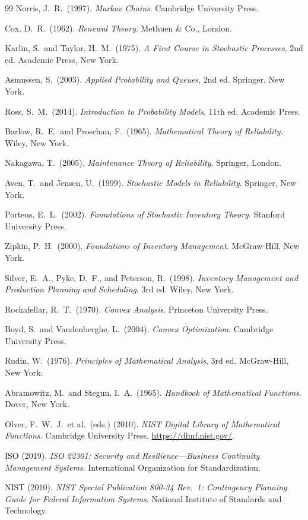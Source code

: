 \documentclass[12pt,a4paper]{article}
\theoremstyle{plain}
\theoremstyle{definition}
\theoremstyle{remark}
\begin{document}
\begin{thebibliography}{99}
Norris, J.\ R.\ (1997).
\textit{Markov Chains}.
Cambridge University Press.

Cox, D.\ R.\ (1962).
\textit{Renewal Theory}.
Methuen \& Co., London.

Karlin, S.\ and Taylor, H.\ M.\ (1975).
\textit{A First Course in Stochastic Processes},
2nd ed.
Academic Press, New York.

Asmussen, S.\ (2003).
\textit{Applied Probability and Queues},
2nd ed.
Springer, New York.

Ross, S.\ M.\ (2014).
\textit{Introduction to Probability Models},
11th ed.
Academic Press.

Barlow, R.\ E.\ and Proschan, F.\ (1965).
\textit{Mathematical Theory of Reliability}.
Wiley, New York.

Nakagawa, T.\ (2005).
\textit{Maintenance Theory of Reliability}.
Springer, London.

Aven, T.\ and Jensen, U.\ (1999).
\textit{Stochastic Models in Reliability}.
Springer, New York.

Porteus, E.\ L.\ (2002).
\textit{Foundations of Stochastic Inventory Theory}.
Stanford University Press.

Zipkin, P.\ H.\ (2000).
\textit{Foundations of Inventory Management}.
McGraw-Hill, New York.

Silver, E.\ A., Pyke, D.\ F., and Peterson, R.\ (1998).
\textit{Inventory Management and Production Planning and Scheduling},
3rd ed.
Wiley, New York.

Rockafellar, R.\ T.\ (1970).
\textit{Convex Analysis}.
Princeton University Press.

Boyd, S.\ and Vandenberghe, L.\ (2004).
\textit{Convex Optimization}.
Cambridge University Press.

Rudin, W.\ (1976).
\textit{Principles of Mathematical Analysis},
3rd ed.
McGraw-Hill, New York.

Abramowitz, M.\ and Stegun, I.\ A.\ (1965).
\textit{Handbook of Mathematical Functions}.
Dover, New York.

Olver, F.\ W.\ J.\ et al.\ (eds.) (2010).
\textit{NIST Digital Library of Mathematical Functions}.
Cambridge University Press.
\url{https://dlmf.nist.gov/}.

ISO (2019).
\textit{ISO 22301: Security and Resilience---Business Continuity
Management Systems}.
International Organization for Standardization.

NIST (2010).
\textit{NIST Special Publication 800-34 Rev.\ 1:
Contingency Planning Guide for Federal Information Systems}.
National Institute of Standards and Technology.

\end{thebibliography}
\end{document}
